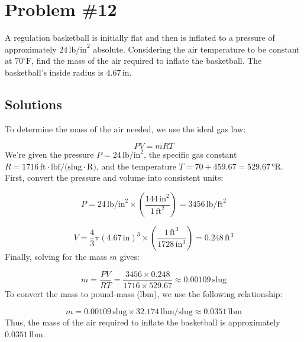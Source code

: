 \documentclass{article}
\begin{document}
\section*{Problem \#12}
A regulation basketball is initially flat and then is inflated to a pressure of approximately \(24 \, \text{lb/in}^2\) absolute. Considering the air temperature to be constant at \(70^\circ \text{F}\), find the mass of the air required to inflate the basketball. The basketball's inside radius is \(4.67 \, \text{in}\).

\subsection*{Solutions}
To determine the mass of the air needed, we use the ideal gas law:

\[
PV = mRT
\]
We're given the pressure \( P = 24 \, \text{lb/in}^2 \), the specific gas constant \( R = 1716 \, \text{ft} \cdot \text{lbf/(slug} \cdot \text{R)} \), and the temperature \( T = 70 + 459.67 = 529.67 \, \text{°R} \).
\newline
\newline
First, convert the pressure and volume into consistent units:

\[
P = 24 \, \text{lb/in}^2 \times \left( \frac{144 \, \text{in}^2}{1 \, \text{ft}^2} \right) = 3456 \, \text{lb/ft}^2
\]

\[
V = \frac{4}{3} \pi (4.67 \, \text{in})^3 \times \left( \frac{1 \, \text{ft}^3}{1728 \, \text{in}^3} \right) = 0.248 \, \text{ft}^3
\]
Finally, solving for the mass \( m \) gives:

\[
m = \frac{PV}{RT} = \frac{3456 \times 0.248}{1716 \times 529.67} \approx 0.00109 \, \text{slug}
\]
To convert the mass to pound-mass (lbm), we use the following relationship:

\[
m = 0.00109 \, \text{slug} \times 32.174 \, \text{lbm/slug} \approx 0.0351 \, \text{lbm}
\]
Thus, the mass of the air required to inflate the basketball is approximately \(0.0351 \, \text{lbm}\).
\end{document}
